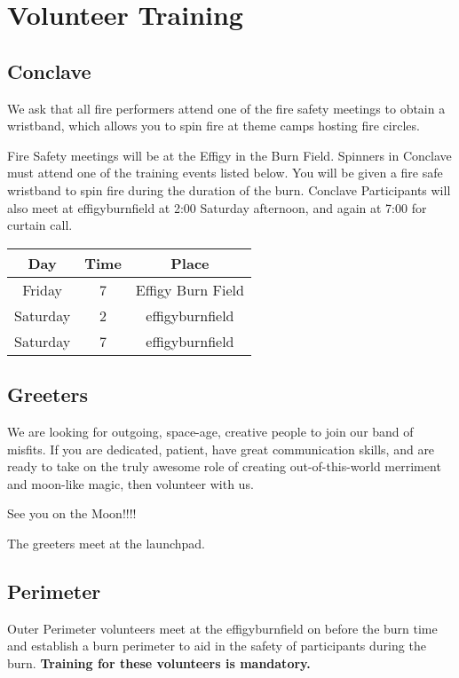 \section*{Volunteer Training}

\subsection*{Conclave}
We ask that all fire performers attend one of the fire safety meetings to obtain a wristband, which allows you to spin fire at theme camps hosting fire circles.

Fire Safety meetings will be at the Effigy in the Burn Field. Spinners in Conclave must attend one of the training events listed below. You will be given a fire safe wristband to spin fire during the duration of the burn. Conclave Participants will also meet at \gls{effigyburnfield} at 2:00\pm{} Saturday afternoon, and again at 7:00\pm{} for curtain call.

\begin{center}
\footnotesize
\begin{tabular}{|c|c|c|}
\hline
\textbf{Day} & \textbf{Time} & \textbf{Place} \\ \hline
Friday & 7\pm{} &  Effigy Burn Field  \\ \hline
Saturday & 2\pm{} & \gls{effigyburnfield}  \\ \hline
Saturday & 7\pm{} & \gls{effigyburnfield}  \\ \hline
\end{tabular}
\end{center}

\subsection*{Greeters}

We are looking for outgoing, space-age, creative people to join our band of misfits.  If you are dedicated, patient, have great communication skills, and are ready to take on the truly awesome role of creating out-of-this-world merriment and moon-like magic, then volunteer with us. 

See you on the Moon!!!!

The \glspl{greeter} meet at the \gls{launchpad}.


\subsection*{Perimeter}
Outer Perimeter volunteers meet at the \gls{effigyburnfield} on before the burn time and establish a burn perimeter to aid in the safety of participants during the burn.\textbf{ Training for these volunteers is mandatory.}

